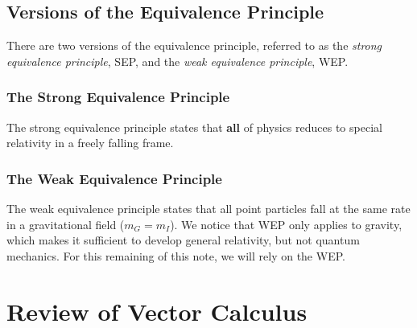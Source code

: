 \documentclass{article}
\theoremstyle{definition}
\begin{document}
\subsection{Versions of the Equivalence Principle}
There are two versions of the equivalence principle, referred to as the \textit{strong equivalence principle}, SEP, and the \textit{weak equivalence principle}, WEP. 
\subsubsection{The Strong Equivalence Principle}
The strong equivalence principle states that \textbf{all} of physics reduces to special relativity in a freely falling frame.
\subsubsection{The Weak Equivalence Principle}
The weak equivalence principle states that all point particles fall at the same rate in a gravitational field ($m_G = m_I$). We notice that WEP only applies to gravity, which makes it sufficient to develop general relativity, but not quantum mechanics. For this remaining of this note, we will rely on the WEP. 

\newpage

\section{Review of Vector Calculus}
\end{document}
